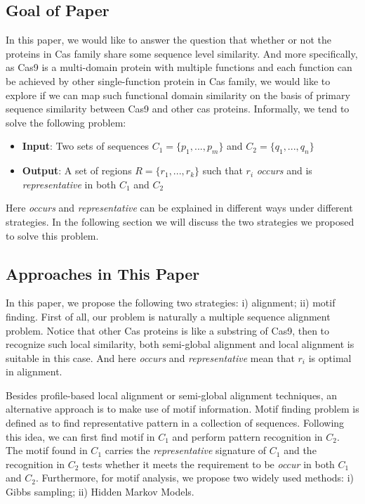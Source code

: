 \documentclass[11pt, oneside]{article}
\begin{document}
\subsection{Goal of Paper}

In this paper, we would like to answer the question that whether or not the proteins in Cas family share some sequence level similarity. And more specifically, as Cas9 is a multi-domain protein with multiple functions and each function can be achieved by other single-function protein in Cas family, we would like to explore if we can map such functional domain similarity on the basis of primary sequence similarity between Cas9 and other cas proteins. Informally, we tend to solve the following problem:
\begin{itemize}
	\item \textbf{Input}: Two sets of sequences $C_1 = \{p_1, ..., p_m\}$ and $C_2 = \{q_1, ..., q_n\}$
	\item \textbf{Output}: A set of regions $R = \{r_1, ..., r_k\}$ such that $r_i$ \textit{occurs} and is \textit{representative} in both $C_1$ and $C_2$ 
\end{itemize}
Here \textit{occurs} and \textit{representative} can be explained in different ways under different strategies. In the following section we will discuss the two strategies we proposed to solve this problem.

\subsection{Approaches in This Paper}

In this paper, we propose the following two strategies: i) alignment; ii) motif finding. First of all, our problem is naturally a multiple sequence alignment problem. Notice that other Cas proteins is like a substring of Cas9, then to recognize such local similarity, both semi-global alignment and local alignment is suitable in this case. And here \textit{occurs} and \textit{representative} mean that $r_i$ is optimal in alignment.  

Besides profile-based local alignment or semi-global alignment techniques, an alternative approach is to make use of motif information. Motif finding problem is defined as to find representative pattern in a collection of sequences. Following this idea, we can first find motif in $C_1$ and perform pattern recognition in $C_2$. The motif found in $C_1$ carries the \textit{representative} signature of $C_1$ and the recognition in $C_2$ tests whether it meets the requirement to be \textit{occur} in both $C_1$ and $C_2$. Furthermore, for motif analysis, we propose two widely used methods: i) Gibbs sampling; ii) Hidden Markov Models. 
\end{document}
